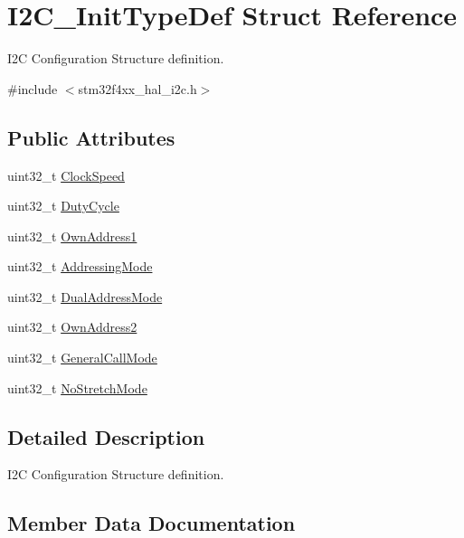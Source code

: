 \hypertarget{struct_i2_c___init_type_def}{}\section{I2\+C\+\_\+\+Init\+Type\+Def Struct Reference}
\label{struct_i2_c___init_type_def}


I2C Configuration Structure definition.  




{\ttfamily \#include $<$stm32f4xx\+\_\+hal\+\_\+i2c.\+h$>$}

\subsection*{Public Attributes}
\begin{DoxyCompactItemize}
\item 
uint32\+\_\+t \hyperlink{struct_i2_c___init_type_def_a45f1209e7e43e55f055bd9ead064230a}{Clock\+Speed}
\item 
uint32\+\_\+t \hyperlink{struct_i2_c___init_type_def_a91eb2f998ac771478ec0f44ac73c32dd}{Duty\+Cycle}
\item 
uint32\+\_\+t \hyperlink{struct_i2_c___init_type_def_abfb610317ea08e85c8feece82ccc9e16}{Own\+Address1}
\item 
uint32\+\_\+t \hyperlink{struct_i2_c___init_type_def_a5c39c41a5ee892c1bce69a579cc017ca}{Addressing\+Mode}
\item 
uint32\+\_\+t \hyperlink{struct_i2_c___init_type_def_add6a6b87ee067d33c94c554288736d40}{Dual\+Address\+Mode}
\item 
uint32\+\_\+t \hyperlink{struct_i2_c___init_type_def_a8165caf61b7b52f903edd7517ddaa06b}{Own\+Address2}
\item 
uint32\+\_\+t \hyperlink{struct_i2_c___init_type_def_a17ce92b135a4b5c045a5387c91677803}{General\+Call\+Mode}
\item 
uint32\+\_\+t \hyperlink{struct_i2_c___init_type_def_a28afdce458703464638f1a01e04da04e}{No\+Stretch\+Mode}
\end{DoxyCompactItemize}


\subsection{Detailed Description}
I2C Configuration Structure definition. 

\subsection{Member Data Documentation}
